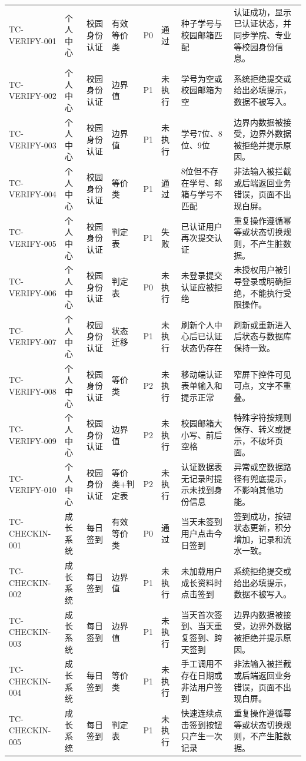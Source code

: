 \documentclass[UTF8,zihao=-4]{ctexart}
\begin{document}
{\begin{longtable}{P{1.8cm}P{1.7cm}P{2.2cm}P{1.8cm}P{1cm}P{1.2cm}P{4.1cm}P{5.3cm}}
TC-VERIFY-001 & 个人中心 & 校园身份认证 & 有效等价类 & P0 & 通过 & 种子学号与校园邮箱匹配 & 认证成功，显示已认证状态，并同步学院、专业等校园身份信息。 \\
TC-VERIFY-002 & 个人中心 & 校园身份认证 & 边界值 & P1 & 未执行 & 学号为空或校园邮箱为空 & 系统拒绝提交或给出必填提示，数据不被写入。 \\
TC-VERIFY-003 & 个人中心 & 校园身份认证 & 边界值 & P1 & 未执行 & 学号7位、8位、9位 & 边界内数据被接受，边界外数据被拒绝并提示原因。 \\
TC-VERIFY-004 & 个人中心 & 校园身份认证 & 等价类 & P1 & 通过 & 8位但不存在学号、邮箱与学号不匹配 & 非法输入被拦截或后端返回业务错误，页面不出现白屏。 \\
TC-VERIFY-005 & 个人中心 & 校园身份认证 & 判定表 & P1 & 失败 & 已认证用户再次提交认证 & 重复操作遵循幂等或状态切换规则，不产生脏数据。 \\
TC-VERIFY-006 & 个人中心 & 校园身份认证 & 判定表 & P0 & 未执行 & 未登录提交认证应被拒绝 & 未授权用户被引导登录或明确拒绝，不能执行受限操作。 \\
TC-VERIFY-007 & 个人中心 & 校园身份认证 & 状态迁移 & P1 & 未执行 & 刷新个人中心后已认证状态仍存在 & 刷新或重新进入后状态与数据库保持一致。 \\
TC-VERIFY-008 & 个人中心 & 校园身份认证 & 等价类 & P2 & 未执行 & 移动端认证表单输入和提示正常 & 窄屏下控件可见可点，文字不重叠。 \\
TC-VERIFY-009 & 个人中心 & 校园身份认证 & 边界值 & P2 & 未执行 & 校园邮箱大小写、前后空格 & 特殊字符按规则保存、转义或提示，不破坏页面。 \\
TC-VERIFY-010 & 个人中心 & 校园身份认证 & 等价类+判定表 & P2 & 未执行 & 认证数据表无记录时提示未找到身份信息 & 异常或空数据路径有兜底提示，不影响其他功能。 \\
TC-CHECKIN-001 & 成长系统 & 每日签到 & 有效等价类 & P0 & 通过 & 当天未签到用户点击今日签到 & 签到成功，按钮状态更新，积分增加，记录和流水一致。 \\
TC-CHECKIN-002 & 成长系统 & 每日签到 & 边界值 & P1 & 未执行 & 未加载用户成长资料时点击签到 & 系统拒绝提交或给出必填提示，数据不被写入。 \\
TC-CHECKIN-003 & 成长系统 & 每日签到 & 边界值 & P1 & 未执行 & 当天首次签到、当天重复签到、跨天签到 & 边界内数据被接受，边界外数据被拒绝并提示原因。 \\
TC-CHECKIN-004 & 成长系统 & 每日签到 & 等价类 & P1 & 未执行 & 手工调用不存在日期或非法用户签到 & 非法输入被拦截或后端返回业务错误，页面不出现白屏。 \\
TC-CHECKIN-005 & 成长系统 & 每日签到 & 判定表 & P1 & 未执行 & 快速连续点击签到按钮只产生一次记录 & 重复操作遵循幂等或状态切换规则，不产生脏数据。 \\

\end{longtable}}
\end{document}

